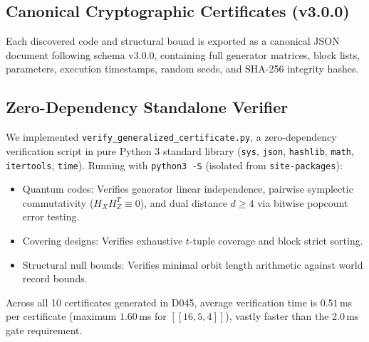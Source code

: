 \documentclass[11pt,a4paper]{article}
\begin{document}
\subsection{Canonical Cryptographic Certificates (v3.0.0)}
\label{sec:certs}
Each discovered code and structural bound is exported as a canonical JSON document following schema v3.0.0, containing full generator matrices, block lists, parameters, execution timestamps, random seeds, and SHA-256 integrity hashes.

\subsection{Zero-Dependency Standalone Verifier}
\label{sec:standalone}
We implemented \texttt{verify\_generalized\_certificate.py}, a zero-dependency verification script in pure Python 3 standard library (\texttt{sys}, \texttt{json}, \texttt{hashlib}, \texttt{math}, \texttt{itertools}, \texttt{time}). Running with \texttt{python3 -S} (isolated from \texttt{site-packages}):
\begin{itemize}
    \item Quantum codes: Verifies generator linear independence, pairwise symplectic commutativity ($H_X H_Z^T \equiv 0$), and dual distance $d \ge 4$ via bitwise popcount error testing.
    \item Covering designs: Verifies exhaustive $t$-tuple coverage and block strict sorting.
    \item Structural null bounds: Verifies minimal orbit length arithmetic against world record bounds.
\end{itemize}
Across all 10 certificates generated in D045, average verification time is $0.51$\,ms per certificate (maximum $1.60$\,ms for $[[16, 5, 4]]$), vastly faster than the 2.0\,ms gate requirement.
\end{document}
